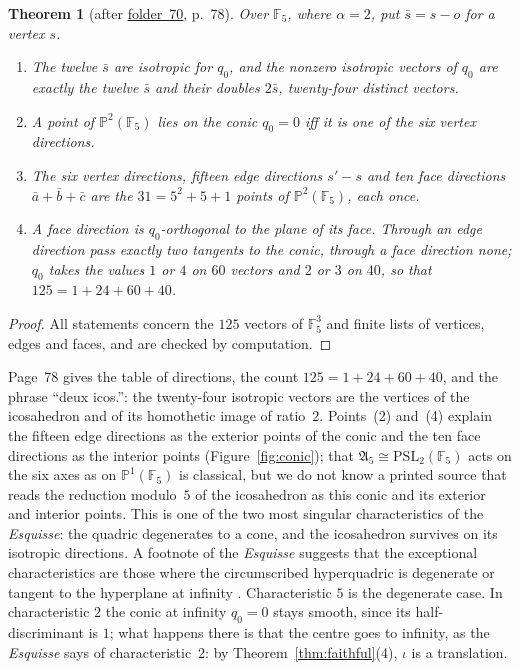 \documentclass[11pt,a4paper]{amsart}
\newtheorem{theorem}{Theorem}[section]
\theoremstyle{definition}
\theoremstyle{remark}
\newcommand{\F}{\mathbb F}
\newcommand{\fac}[1]{\href{https://grothendieck.umontpellier.fr/#1.pdf}{folder~#1}}
\begin{document}
\begin{theorem}[after \fac{70}, p.~78]\label{thm:mod5}
Over $\F_5$, where $\alpha = 2$, put $\bar s = s - o$ for a vertex $s$.
\begin{enumerate}
\item The twelve $\bar s$ are isotropic for $q_0$, and the nonzero isotropic vectors of $q_0$ are exactly the twelve $\bar s$ and their doubles $2\bar s$, twenty-four distinct vectors.
\item A point of $\mathbb P^2(\F_5)$ lies on the conic $q_0 = 0$ iff it is one of the six vertex directions.
\item The six vertex directions, fifteen edge directions $s' - s$ and ten face directions $\bar a + \bar b + \bar c$ are the $31 = 5^2 + 5 + 1$ points of $\mathbb P^2(\F_5)$, each once.
\item A face direction is $q_0$-orthogonal to the plane of its face. Through an edge direction pass exactly two tangents to the conic, through a face direction none; $q_0$ takes the values $1$ or $4$ on $60$ vectors and $2$ or $3$ on $40$, so that $125 = 1 + 24 + 60 + 40$.
\end{enumerate}
\end{theorem}

\begin{proof}
All statements concern the $125$ vectors of $\F_5^3$ and finite lists of vertices, edges and faces, and are checked by computation.
\end{proof}

Page~78 gives the table of directions, the count $125 = 1 + 24 + 60 + 40$, and the phrase ``deux icos.'': the twenty-four isotropic vectors are the vertices of the icosahedron and of its homothetic image of ratio~$2$. Points~(2) and~(4) explain the fifteen edge directions as the exterior points of the conic and the ten face directions as the interior points (Figure~\ref{fig:conic}); that $\mathfrak A_5 \cong \mathrm{PSL}_2(\F_5)$ acts on the six axes as on $\mathbb P^1(\F_5)$ is classical, but we do not know a printed source that reads the reduction modulo~$5$ of the icosahedron as this conic and its exterior and interior points. This is one of the two most singular characteristics of the \emph{Esquisse}: the quadric degenerates to a cone, and the icosahedron survives on its isotropic directions. A footnote of the \emph{Esquisse} suggests that the exceptional characteristics are those where the circumscribed hyperquadric is degenerate or tangent to the hyperplane at infinity \cite[\S4]{esquisse}. Characteristic $5$ is the degenerate case. In characteristic $2$ the conic at infinity $q_0 = 0$ stays smooth, since its half-discriminant is $1$; what happens there is that the centre goes to infinity, as the \emph{Esquisse} says of characteristic~$2$: by Theorem~\ref{thm:faithful}(4), $\iota$ is a translation.
\end{document}
